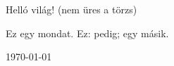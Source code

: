 \documentclass[]{article}
\begin{document}
Helló világ!
(nem üres a törzs)

Ez egy mondat. Ez: pedig; egy másik.

\today
\end{document}

